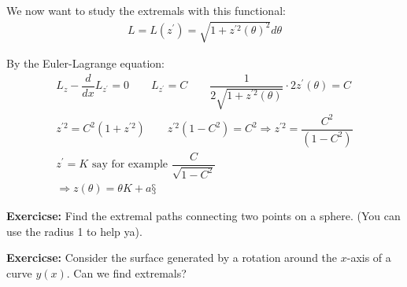 \par\bigskip
\noindent We now want to study the extremals with this functional:
\begin{equation*}
  \begin{gathered}
    L = L(z^{\prime}) = \sqrt{1+z^{\prime2}(\theta)^2}d\theta
  \end{gathered}
\end{equation*}\par
\noindent By the Euler-Lagrange equation:
\begin{equation*}
  \begin{gathered}
    L_z-\dfrac{d}{dx}L_{z^{\prime}} = 0\qquad L_{z^{\prime}} = C\qquad\dfrac{1}{2\sqrt{1+z^{\prime2}(\theta)}}\cdot2z^{\prime}(\theta) = C\\
    z^{\prime2} = C^2(1+z^{\prime2})\qquad z^{\prime2}(1-C^2) = C^2\Rightarrow z^{\prime2} = \dfrac{C^2}{(1-C^2)}\\
    z^{\prime} = K\text{ say for example } \dfrac{C}{\sqrt{1-C^2}}\\
    \Rightarrow z(\theta) = \theta K+a§
  \end{gathered}
\end{equation*}
\par\bigskip
\noindent\textbf{Exercicse:} Find the extremal paths connecting two points on a sphere. (You can use the radius 1 to help ya).
\par\bigskip
\noindent\textbf{Exercicse:} Consider the surface generated by a rotation around the $x$-axis of a curve $y(x)$. Can we find extremals?
\par\bigskip
